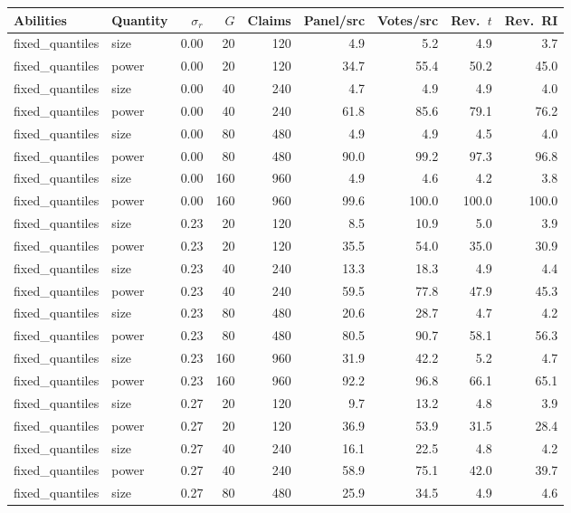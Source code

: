\begin{table}[p]
\centering\scriptsize
\setlength{\tabcolsep}{4pt}
\begin{tabular}{@{}llrrrrrrr@{}}
\toprule
Abilities & Quantity & $\sigma_r$ & $G$ & Claims & Panel/src & Votes/src & Rev.\ $t$ & Rev.\ RI \\
\midrule
fixed\_quantiles & size & 0.00 & 20 & 120 & 4.9 & 5.2 & 4.9 & 3.7 \\
fixed\_quantiles & power & 0.00 & 20 & 120 & 34.7 & 55.4 & 50.2 & 45.0 \\
fixed\_quantiles & size & 0.00 & 40 & 240 & 4.7 & 4.9 & 4.9 & 4.0 \\
fixed\_quantiles & power & 0.00 & 40 & 240 & 61.8 & 85.6 & 79.1 & 76.2 \\
fixed\_quantiles & size & 0.00 & 80 & 480 & 4.9 & 4.9 & 4.5 & 4.0 \\
fixed\_quantiles & power & 0.00 & 80 & 480 & 90.0 & 99.2 & 97.3 & 96.8 \\
fixed\_quantiles & size & 0.00 & 160 & 960 & 4.9 & 4.6 & 4.2 & 3.8 \\
fixed\_quantiles & power & 0.00 & 160 & 960 & 99.6 & 100.0 & 100.0 & 100.0 \\
fixed\_quantiles & size & 0.23 & 20 & 120 & 8.5 & 10.9 & 5.0 & 3.9 \\
fixed\_quantiles & power & 0.23 & 20 & 120 & 35.5 & 54.0 & 35.0 & 30.9 \\
fixed\_quantiles & size & 0.23 & 40 & 240 & 13.3 & 18.3 & 4.9 & 4.4 \\
fixed\_quantiles & power & 0.23 & 40 & 240 & 59.5 & 77.8 & 47.9 & 45.3 \\
fixed\_quantiles & size & 0.23 & 80 & 480 & 20.6 & 28.7 & 4.7 & 4.2 \\
fixed\_quantiles & power & 0.23 & 80 & 480 & 80.5 & 90.7 & 58.1 & 56.3 \\
fixed\_quantiles & size & 0.23 & 160 & 960 & 31.9 & 42.2 & 5.2 & 4.7 \\
fixed\_quantiles & power & 0.23 & 160 & 960 & 92.2 & 96.8 & 66.1 & 65.1 \\
fixed\_quantiles & size & 0.27 & 20 & 120 & 9.7 & 13.2 & 4.8 & 3.9 \\
fixed\_quantiles & power & 0.27 & 20 & 120 & 36.9 & 53.9 & 31.5 & 28.4 \\
fixed\_quantiles & size & 0.27 & 40 & 240 & 16.1 & 22.5 & 4.8 & 4.2 \\
fixed\_quantiles & power & 0.27 & 40 & 240 & 58.9 & 75.1 & 42.0 & 39.7 \\
fixed\_quantiles & size & 0.27 & 80 & 480 & 25.9 & 34.5 & 4.9 & 4.6 \\

\end{tabular}
\end{table}
